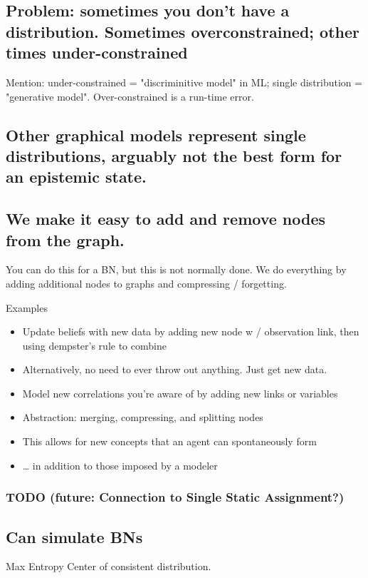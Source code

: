 \documentclass[11pt]{article}
\begin{document}
\subsection{Problem: sometimes you don't have a distribution. Sometimes overconstrained; other times under-constrained}
\label{sec:org2099cb0}

Mention: under-constrained = "discriminitive model" in ML; 
single distribution = "generative model". 
Over-constrained is a run-time error.

\subsection{Other graphical models represent single distributions, arguably not the best form for an epistemic state.}
\label{sec:org8af2731}

\subsection{We make it easy to add and remove nodes from the graph.}
\label{sec:orgf8dd297}

You can do this for a BN, but this is not normally done. We do everything by adding additional nodes to graphs and compressing / forgetting. 

Examples
\begin{itemize}
\item Update beliefs with new data by adding new node w / observation link, then using dempster's rule to combine
\item Alternatively, no need to ever throw out anything. Just get new data.
\item Model new correlations you're aware of by adding new links or variables
\item Abstraction: merging, compressing, and splitting nodes
\item This allows for new concepts that an agent can spontaneously form
\item \ldots{} in addition to those imposed by a modeler
\end{itemize}

\subsubsection{{\bfseries\sffamily TODO} (future: Connection to Single Static Assignment?)}
\label{sec:orgfe614e5}

\subsection{Can simulate BNs}
\label{sec:orge596a2a}
Max Entropy Center of consistent distribution. 
\end{document}
